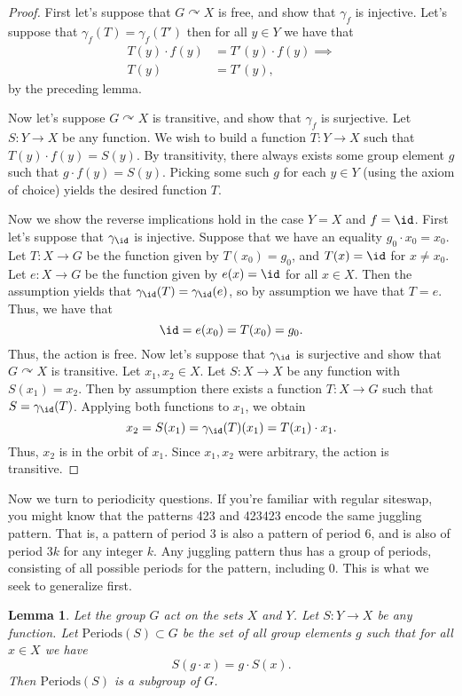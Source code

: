 \documentclass[12nt]{article}
\theoremstyle{plain}
\newtheorem{lemma}{Lemma}
\begin{document}
\begin{proof}
First let's suppose that $G \curvearrowright X$ is free, and show that $\gamma_f$ is injective. Let's suppose that $\gamma_f(T) = \gamma_f(T')$ then for all $y \in Y$ we have that 
\begin{align*}
T(y) \cdot f(y) &= T'(y) \cdot f(y) \implies \\
T(y) &= T'(y),
\end{align*}
by the preceding lemma.

Now let's suppose $G \curvearrowright X$ is transitive, and show that $\gamma_f$ is surjective. Let $S : Y \to X$ be any function. We wish to build a function $T : Y \to X$ such that $T(y) \cdot f(y) = S(y)$. By transitivity, there always exists some group element $g$ such that $g \cdot f(y) = S(y)$. Picking some such $g$ for each $y \in Y$ (using the axiom of choice) yields the desired function $T$. 

Now we show the reverse implications hold in the case $Y = X$ and $f = \id$. First let's suppose that $\gamma_{\id}$ is injective. Suppose that we have an equality $g_0 \cdot x_0 = x_0$. Let $T : X \to G$ be the function given by $T(x_0) = g_0$, and $T(x) = \id$ for $x \neq x_0$. Let $e : X \to G$ be the function given by $e(x) = \id$ for all $x \in X$. Then the assumption yields that $\gamma_{\id}(T) = \gamma_{\id}(e)$, so by assumption we have that $T = e$. Thus, we have that
\[
\id = e(x_0) = T(x_0) = g_0.
\]
Thus, the action is free. Now let's suppose that $\gamma_{\id}$ is surjective and show that $G \curvearrowright X$ is transitive. Let $x_1, x_2 \in X$. Let $S : X \to X$ be any function with $S(x_1) = x_2$. Then by assumption there exists a function $T : X \to G$ such that $S = \gamma_{\id}(T)$. Applying both functions to $x_1$, we obtain
\[
x_2 = S(x_1) = \gamma_{\id}(T)(x_1) = T(x_1) \cdot x_1.
\]
Thus, $x_2$ is in the orbit of $x_1$. Since $x_1, x_2$ were arbitrary, the action is transitive.
\end{proof}


Now we turn to periodicity questions. If you're familiar with regular siteswap, you might know that the patterns 423 and 423423 encode the same juggling pattern. That is, a pattern of period 3 is also a pattern of period 6, and is also of period $3k$ for any integer $k$. Any juggling pattern thus has a group of periods, consisting of all possible periods for the pattern, including 0. This is what we seek to generalize first. 

\begin{lemma}
Let the group $G$ act on the sets $X$ and $Y$. Let $S : Y \to X$ be any function. Let $\text{Periods}(S) \subset G$ be the set of all group elements $g$ such that for all $x \in X$ we have
\[
S(g \cdot x) = g \cdot S(x).
\]
Then $\text{Periods}(S)$ is a subgroup of $G$.
\end{lemma}
\end{document}
